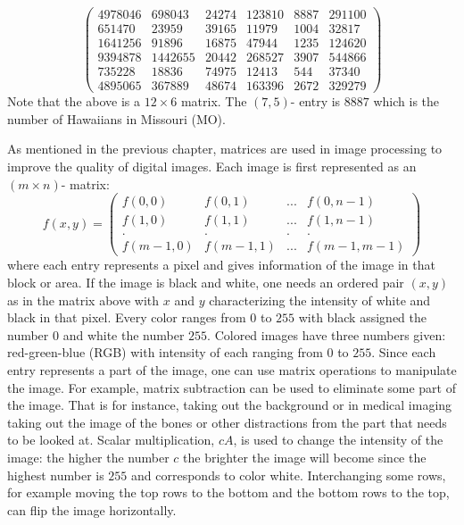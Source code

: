\documentclass{ximera}
\begin{document}
\begin{example}
\begin{explanation}
\[\begin{pmatrix}
  4978046 & 698043 & 24274 & 123810 & 8887 & 291100\\
  651470 & 23959 & 39165 & 11979 & 1004 & 32817\\
  1641256 & 91896 & 16875 & 47944 & 1235 & 124620\\
  9394878 & 1442655 & 20442 & 268527 & 3907 & 544866\\
  735228 & 18836 & 74975 & 12413 & 544 & 37340\\
  4895065 & 367889 & 48674 & 163396 & 2672 & 329279
  \end{pmatrix}
  \]
  Note that the above is a $12\times 6$ matrix. The $(7, 5)$- entry is $8887$ which is the number of Hawaiians in Missouri (MO).
  \end{explanation}
\end{example}

As mentioned in the previous chapter, matrices are used in image processing to improve the quality of digital images. Each image is first represented as an $(m \times n)$- matrix:
\[
f(x,y)= \left(\begin{array}{cccc}
f(0,0) & f(0,1) & ... & f(0, n-1)\\
f(1,0) & f(1,1) & ... & f(1, n-1)\\
 . & . & . & . \\
 f(m-1,0) & f(m-1,1) & ... & f(m-1,m-1)\end{array}\right)
 \]
 where each entry represents a pixel and gives information of the image in that block or area. If the image is black and white, one needs an ordered pair $(x,y)$ as in the matrix above with $x$ and $y$ characterizing the intensity of white and black in that pixel. Every color ranges from $0$ to $255$ with black assigned the number $0$ and white the number $255$. Colored images have three numbers given: red-green-blue (RGB) with intensity of each ranging from $0$ to $255$. Since each entry represents a part of the image, one can use matrix operations to manipulate the image. For example, matrix subtraction can be used to eliminate some part of the image. That is for instance, taking out the background or in medical imaging taking out the image of the bones or other distractions from the part that needs to be looked at. Scalar multiplication, $cA$, is used to change the intensity of the image: the higher the number $c$ the brighter the image will become since the highest number is $255$ and corresponds to color white. Interchanging some rows, for example moving the top rows to the bottom and the bottom rows to the top, can flip the image horizontally.
\end{document}
